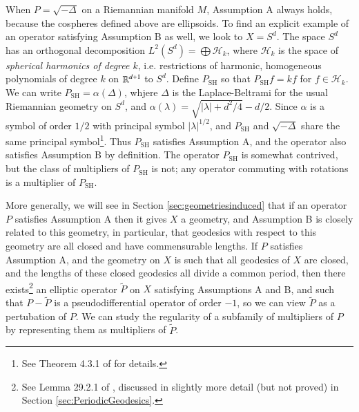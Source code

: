 \vspace{0.5em}

\noindent {}

\vspace{0.4em}

When $P = \sqrt{-\Delta}$ on a Riemannian manifold $M$, Assumption A always holds, because the cospheres defined above are ellipsoids. To find an explicit example of an operator satisfying Assumption B as well, we look to $X = S^d$. The space $S^d$ has an orthogonal decomposition $L^2(S^d) = \bigoplus \mathcal{H}_k$, where $\mathcal{H}_k$ is the space of \emph{spherical harmonics of degree $k$}, i.e. restrictions of harmonic, homogeneous polynomials of degree $k$ on $\operatorname{\mathbb{R}}^{d+1}$ to $S^d$. Define $P_{\text{SH}}$ so that $P_{\text{SH}} f = kf$ for $f \in \mathcal{H}_k$. We can write $P_{\text{SH}} = \alpha(\Delta)$, whjere $\Delta$ is the Laplace-Beltrami for the usual Riemannian geometry on $S^d$, and $\alpha(\lambda) = \sqrt{ |\lambda| + d^2/4 } - d/2$. Since $\alpha$ is a symbol of order $1/2$ with principal symbol $|\lambda|^{1/2}$, and $P_{\text{SH}}$ and $\sqrt{-\Delta}$ share the same principal symbol\footnote{See Theorem 4.3.1 of \cite{Sogge} for details.}. Thus $P_{\text{SH}}$ satisfies Assumption A, and the operator also satisfies Assumption B by definition. The operator $P_{\text{SH}}$ is somewhat contrived, but the class of multipliers of $P_{\text{SH}}$ is not; any operator commuting with rotations is a multiplier of $P_{\text{SH}}$.

More generally, we will see in Section \ref{sec:geometriesinduced} that if an operator $P$ satisfies Assumption A then it gives $X$ a geometry, and Assumption B is closely related to this geometry, in particular, that geodesics with respect to this geometry are all closed and have commensurable lengths. If $P$ satisfies Assumption A, and the geometry on $X$ is such that all geodesics of $X$ are closed, and the lengths of these closed geodesics all divide a common period, then there exists\footnote{See Lemma 29.2.1 of \cite{Hormander4}, discussed in slightly more detail (but not proved) in Section \ref{sec:PeriodicGeodesics}.} an elliptic operator $\tilde{P}$ on $X$ satisfying Assumptions A and B, and such that $P - \tilde{P}$ is a pseudodifferential operator of order $-1$, so we can view $\tilde{P}$ as a pertubation of $P$. We can study the regularity of a subfamily of multipliers of $P$ by representing them as multipliers of $\tilde{P}$.

